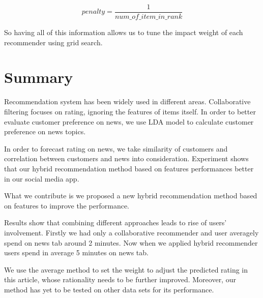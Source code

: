 \documentclass{article}
\begin{document}
\begin{equation}
    \textit{penalty} = \frac{1}{\textit{num\_of\_item\_in\_rank}}
\end{equation}



    So having all of this information allows us to tune the impact weight of each recommender using grid search.






\section{Summary}
\label{sec:summary}


Recommendation system has been widely used in different areas. Collaborative filtering focuses on rating, ignoring the features of items itself. In order to better evaluate customer preference on news, we use LDA model to
calculate customer preference on news topics.

In order to forecast rating on news, we take similarity of customers and correlation between customers and news into consideration. Experiment shows that our hybrid recommendation method based on features performances better in our social media app.

What we contribute is we proposed a new hybrid recommendation method based on features to improve the performance.

Results show that combining different approaches leads to rise of users' involvement. Firstly we had only a collaborative recommender and user averagely spend on news tab around 2 minutes. Now when we applied hybrid recommender users spend in average 5 minutes on news tab.

We use the average method to set the weight to adjust the predicted rating in this article, whose rationality needs to be further improved. Moreover, our method has yet to be tested on other data sets for its performance.  


  
\end{document}
